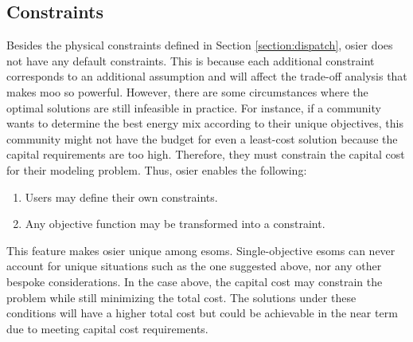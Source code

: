 \subsection{Constraints}
\label{section:constraints}

Besides the physical constraints defined in Section \ref{section:dispatch},
\ac{osier} does not have any default constraints. This is because each
additional constraint corresponds to an additional assumption and will affect
the trade-off analysis that makes \ac{moo} so powerful. However, there are some
circumstances where the optimal solutions are still
infeasible in practice. For instance, if a community wants to determine the best
energy mix according to their unique objectives, this community might not have
the budget for even a least-cost solution because the capital requirements are
too high. Therefore, they must constrain the capital cost for their modeling
problem. Thus, \ac{osier} enables the following:
\begin{enumerate}
    \item Users may define their own constraints.
    \item Any objective function may be transformed into a constraint.
\end{enumerate}
This feature makes \ac{osier} unique among \acp{esom}.
Single-objective \acp{esom} can never account for unique situations such as the
one suggested above, nor any other bespoke considerations. In the case above,
the capital cost may constrain the problem while still minimizing the total
cost. The solutions under these conditions will have a higher total cost but
could be achievable in the near term due to meeting capital cost requirements.